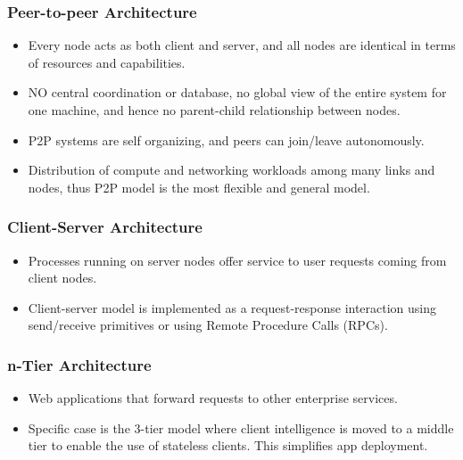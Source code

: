 \documentclass{article}
\begin{document}
\subsubsection{Peer-to-peer Architecture}
\begin{itemize}
    \item Every node acts as both client and server, and all nodes are identical in terms of resources and capabilities.
    
    \item NO central coordination or database, no global view of the entire system for one machine, and hence no parent-child relationship between nodes. 
    
    \item P2P systems are self organizing, and peers can join/leave autonomously.
    
    \item Distribution of compute and networking workloads among many links and nodes, thus P2P model is the most flexible and general model.
\end{itemize}

\subsubsection{Client-Server Architecture}
\begin{itemize}
    \item Processes running on server nodes offer service to user requests coming from client nodes. 
    
    \item Client-server model is implemented as a request-response interaction using send/receive primitives or using Remote Procedure Calls (RPCs). 
\end{itemize}

\subsubsection{n-Tier Architecture}
\begin{itemize}
    \item Web applications that forward requests to other enterprise services. 
    
    \item Specific case is the 3-tier model where client intelligence is moved to a middle tier to enable the use of stateless clients. This simplifies app deployment.
\end{itemize}
\end{document}
